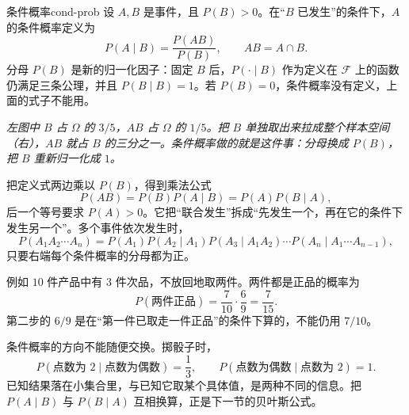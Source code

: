 \begin{mydef}{条件概率}{cond-prob}
设 $A,B$ 是事件，且 $P(B)>0$。在“$B$ 已发生”的条件下，$A$ 的条件概率定义为
\[
P(A\mid B)=\frac{P(AB)}{P(B)},\qquad AB=A\cap B.
\]
分母 $P(B)$ 是新的归一化因子：固定 $B$ 后，$P(\cdot\mid B)$ 作为定义在 $\mathcal F$ 上的函数仍满足三条公理，并且 $P(B\mid B)=1$。若 $P(B)=0$，条件概率没有定义，上面的式子不能用。
\end{mydef}

\begin{center}
\par\vspace{2pt}
{\footnotesize\itshape 左图中 $B$ 占 $\Omega$ 的 $3/5$，$AB$ 占 $\Omega$ 的 $1/5$。把 $B$ 单独取出来拉成整个样本空间（右），$AB$ 就占 $B$ 的三分之一。条件概率做的就是这件事：分母换成 $P(B)$，把 $B$ 重新归一化成 $1$。}
\end{center}

把定义式两边乘以 $P(B)$，得到乘法公式
\[
P(AB)=P(B)P(A\mid B)=P(A)P(B\mid A),
\]
后一个等号要求 $P(A)>0$。它把“联合发生”拆成“先发生一个，再在它的条件下发生另一个”。多个事件依次发生时，
\[
P(A_1A_2\cdots A_n)=P(A_1)P(A_2\mid A_1)P(A_3\mid A_1A_2)\cdots P(A_n\mid A_1\cdots A_{n-1}),
\]
只要右端每个条件概率的分母都为正。

例如 $10$ 件产品中有 $3$ 件次品，不放回地取两件。两件都是正品的概率为
\[
P(\text{两件正品})=\frac{7}{10}\cdot\frac{6}{9}=\frac{7}{15}.
\]
第二步的 $6/9$ 是在“第一件已取走一件正品”的条件下算的，不能仍用 $7/10$。

条件概率的方向不能随便交换。掷骰子时，
\[
P(\text{点数为 }2\mid\text{点数为偶数})=\frac13,\qquad
P(\text{点数为偶数}\mid\text{点数为 }2)=1 .
\]
已知结果落在小集合里，与已知它取某个具体值，是两种不同的信息。把 $P(A\mid B)$ 与 $P(B\mid A)$ 互相换算，正是下一节的贝叶斯公式。

